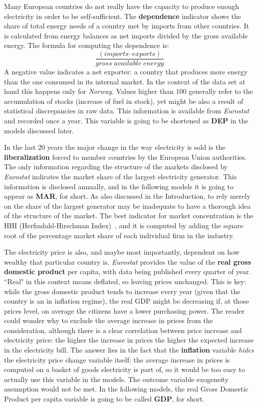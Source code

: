 \documentclass[a4paper,12pt]{book}
\begin{document}
Many European countries do not really have the capacity to produce enough electricity in order to be self-sufficient. The \textbf{dependence} indicator shows the share of total energy needs of a country met by imports from other countries. It is calculated from energy balances as net imports divided by the gross available energy. The formula for computing the dependence is: $$\frac{(imports – exports)}{gross\;available\;energy}$$ A negative value indicates a net exporter: a country that produces more energy than the one consumed in its internal market. In the context of the data set at hand this happens only for \textit{Norway}. Values higher than 100 generally refer to the accumulation of stocks (increase of fuel in stock), yet might be also a result of statistical discrepancies in raw data. This information is available from \textit{Eurostat} and recorded once a year. This variable is going to be shortened as \textbf{DEP} in the models discussed later.

In the last 20 years the major change in the way electricity is sold is the \textbf{liberalization} forced to member countries by the European Union authorities. The only information regarding the structure of the markets disclosed by \textit{Eurostat} indicates the market share of the largest electricity generator. This information is disclosed annually, and in the following models it is going to appear as \textbf{MAR}, for short. As also discussed in the Introduction, to rely merely on the share of the largest generator may be inadequate to have a thorough idea of the structure of the market. The best indicator for market concentration is the HHI (Herfindahl-Hirschman Index)~\cite{viscusi2018economics}, and it is computed by adding the square root of the percentage market share of each individual firm in the industry.

The electricity price is also, and maybe most importantly, dependent on how wealthy that particular country is. \textit{Eurostat} provides the value of the \textbf{real gross domestic product} per capita, with data being published every quarter of year. ``Real" in this context means deflated, so leaving prices unchanged. This is key: while the gross domestic product tends to increase every year (given that the country is an in inflation regime), the real GDP might be decreasing if, at those prices level, on average the citizens have a lower purchasing power. The reader could wonder why to exclude the average increase in prices from the consideration, although there is a clear correlation between price increase and electricity price: the higher the increase in prices the higher the expected increase in the electricity bill. The answer lies in the fact that the \textbf{inflation} variable \textit{hides} the electricity price change variable itself: the average increase in prices is computed on a basket of goods electricity is part of, so it would be too easy to actually use this variable in the models. The outcome variable exogeneity assumption would not be met. In the following models, the real Gross Domestic Product per capita variable is going to be called \textbf{GDP}, for short.
\end{document}
